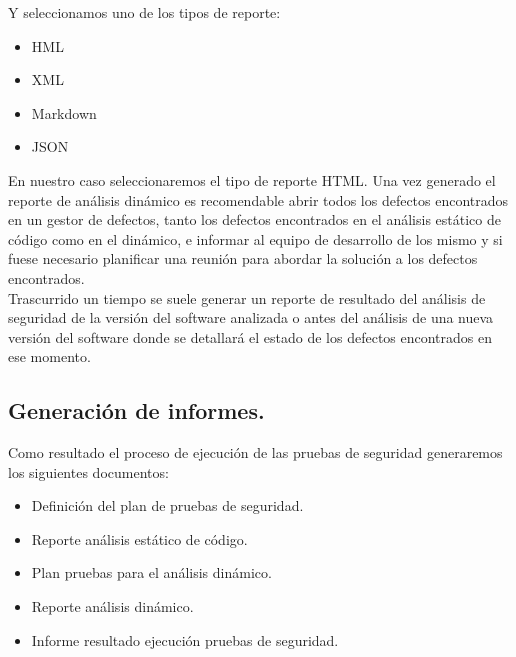 Y seleccionamos uno de los tipos de reporte:

\begin{itemize}
    \item HML
    \item XML
    \item Markdown
    \item JSON
\end{itemize}

En nuestro caso seleccionaremos el tipo de reporte HTML. Una vez generado el reporte de análisis dinámico es recomendable 
abrir todos los defectos encontrados en un gestor de defectos, tanto los defectos encontrados en el
análisis estático de código como en el  dinámico, e informar al equipo de desarrollo de los mismo y si fuese necesario 
planificar una reunión para abordar la solución a los defectos encontrados.\\

Trascurrido un tiempo se suele generar un reporte de resultado del análisis de seguridad de la versión del software analizada o antes 
del análisis de una nueva versión del software donde se detallará el estado de los defectos encontrados en ese momento. 
\newpage

\subsection{Generación de informes.}
\label{section:GeneracionInformes}

Como resultado el proceso de ejecución de las pruebas de seguridad generaremos los siguientes documentos:

\begin{itemize}
    \item Definición del plan de pruebas de seguridad.
    \item Reporte análisis estático de código.
    \item Plan pruebas para el análisis dinámico.
    \item Reporte análisis dinámico.
    \item Informe resultado ejecución pruebas de seguridad.
\end{itemize}

\newpage